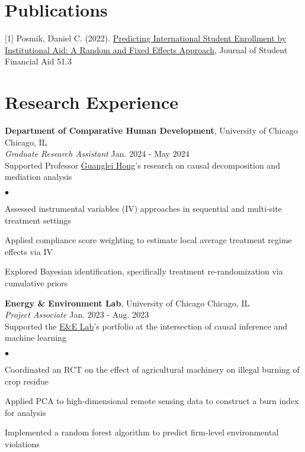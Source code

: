 \documentclass[margin,line, 10pt]{cv}
\newenvironment{list2}{
  \begin{list}{$\bullet$}{%
      \setlength{\itemsep}{0in}
      \setlength{\parsep}{0in} \setlength{\parskip}{0in}
      \setlength{\topsep}{0in} \setlength{\partopsep}{0in} 
      \setlength{\leftmargin}{0.2in}}}{\end{list}}
\begin{document}
\begin{resume}
\section{\sc Publications} 
[1] Posmik, Daniel C. (2022). \href{https://ir.library.louisville.edu/jsfa/vol51/iss3/4/}{Predicting International Student Enrollment by Institutional Aid: A Random and Fixed Effects Approach}, Journal of Student Financial Aid 51.3  

\section{\sc Research Experience}
{\bf Department of Comparative Human Development}, University of Chicago \hfill Chicago, IL\\
{\em Graduate Research Assistant} \hfill {Jan. 2024 - May 2024}\\
Supported Professor \href{https://voices.uchicago.edu/ghong/}{Guanglei Hong}'s research on causal decomposition and mediation analysis

\vspace*{.05in}  
\begin{list2}
\item Assessed instrumental variables (IV) approaches in sequential and multi-site treatment settings  
\item Applied compliance score weighting to estimate local average treatment regime effects via IV
\item Explored Bayesian identification, specifically treatment re-randomization via cumulative priors 
\end{list2}

{\bf Energy \& Environment Lab}, University of Chicago \hfill Chicago, IL\\ 
{\em Project Associate} \hfill {Jan. 2023 - Aug. 2023}\\
Supported the \href{https://urbanlabs.uchicago.edu/labs/energy-environment}{E\&E Lab}'s portfolio at the intersection of causal inference and machine learning

\vspace*{.05in}  
\begin{list2}
\item Coordinated an RCT on the effect of agricultural machinery on illegal burning of crop residue
\item Applied PCA to high-dimensional remote sensing data to construct a burn index for analysis
\item Implemented a random forest algorithm to predict firm-level environmental violations
\end{list2}


\end{resume}
\end{document}
